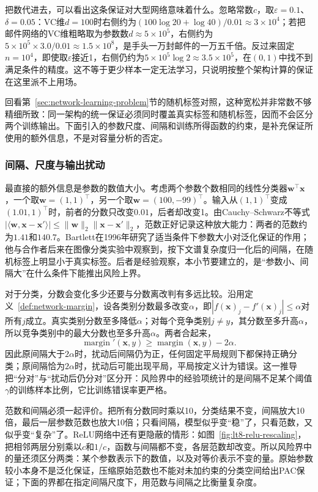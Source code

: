 把数代进去，可以看出这条保证对大型网络意味着什么。忽略常数$c$，取$\varepsilon=0.1$、$\delta=0.05$：VC维$d=100$时右侧约为$(100\log20+\log40)/0.01\approx3\times10^4$；若把邮件网络的VC维粗略取为参数数$d\approx5\times10^5$，右侧约为$5\times10^5\times3.0/0.01\approx1.5\times10^8$，是手头一万封邮件的一万五千倍。反过来固定$n=10^4$，即使取$\varepsilon$接近1，右侧仍约为$5\times10^5\log2\approx3.5\times10^5$，在$(0,1)$中找不到满足条件的精度。这不等于更少样本一定无法学习，只说明按整个架构计算的保证在这里派不上用场。

回看第~\ref{sec:network-learning-problem}节的随机标签对照，这种宽松并非常数不够精细所致：同一架构的统一保证必须同时覆盖真实标签和随机标签，因而不会区分两个训练输出。下面引入的参数尺度、间隔和训练所得函数的约束，是补充保证所使用的额外信息，不是对容量分析的否定。

\subsubsection{间隔、尺度与输出扰动}

最直接的额外信息是参数的数值大小。考虑两个参数个数相同的线性分类器$\bm w^\top\bm x$，一个取$\bm w=(1,1)^\top$，另一个取$\bm w=(100,-99)^\top$。输入从$(1,1)^\top$变成$(1.01,1)^\top$时，前者的分数只改变$0.01$，后者却改变1。由Cauchy--Schwarz不等式$|\langle\bm w,\bm x-\bm x'\rangle|\leq\|\bm w\|_2\|\bm x-\bm x'\|_2$，范数正好记录这种放大能力：两者的范数约为$1.41$和$140.7$。Bartlett在1996年研究了适当条件下参数大小对泛化保证的作用；他与合作者后来在图像分类实验中观察到，按下文谱复杂度归一化后的间隔，在随机标签上明显小于真实标签。后者是经验观察，本小节要建立的，是“参数小、间隔大”在什么条件下能推出风险上界。

对于分类，分数会变化多少还要与分数离改判有多远比较。沿用定义~\ref{def:network-margin}，设各类别分数最多改变$\alpha$，即$|f(\bm x)_j-f'(\bm x)_j|\leq\alpha$对所有$j$成立。真实类别分数至多降低$\alpha$；对每个竞争类别$j\neq y$，其分数至多升高$\alpha$，所以竞争类别中的最大分数也至多升高$\alpha$。两者合起来，
\[
 \operatorname{margin}'(\bm x,y)\geq\operatorname{margin}(\bm x,y)-2\alpha.
\]
因此原间隔大于$2\alpha$时，扰动后间隔仍为正，任何固定平局规则下都保持正确分类；原间隔恰为$2\alpha$时，扰动后可能出现平局，平局按定义计为错误。这一推导把“分对”与“扰动后仍分对”区分开：风险界中的经验项统计的是间隔不足某个阈值$\gamma$的训练样本比例，它比训练错误率更严格。

范数和间隔必须一起评价。把所有分数同时乘以10，分类结果不变，间隔放大10倍，最后一层参数范数也放大10倍；只看间隔，模型似乎变“稳”了，只看范数，又似乎变“复杂”了。ReLU网络中还有更隐蔽的情形：如图~\ref{fig:lt8-relu-rescaling}，把相邻两层分别乘以$c$和$1/c$，函数与间隔都不变，各层范数却改变。所以风险界中的量还须区分两类：某个参数表示下的数值，以及对等价表示不变的量。原始参数较小本身不是泛化保证，压缩原始范数也不能对未加约束的分类空间给出PAC保证；下面的界都在指定间隔尺度下，用范数与间隔之比衡量复杂度。

